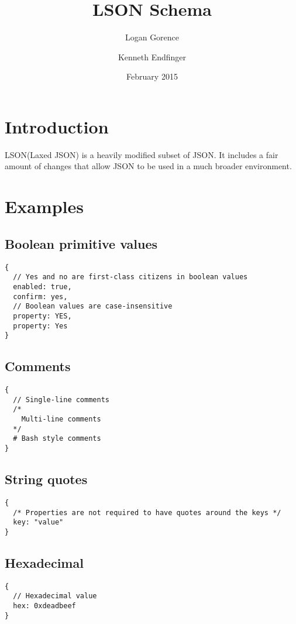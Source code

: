 \documentclass[12pt]{article}
\begin{document}
\title{LSON Schema}
\author{Logan Gorence \and Kenneth Endfinger}
\date{February 2015}
\maketitle
{}
\newpage

\tableofcontents
\newpage

\section{Introduction}
LSON(Laxed JSON) is a heavily modified subset of JSON. It includes a fair amount of changes that allow JSON to be used in a much  broader environment.

\section{Examples}
\subsection{Boolean primitive values}
\label{booleanPrimValueExample}
\begin{lstlisting}
{
  // Yes and no are first-class citizens in boolean values
  enabled: true,
  confirm: yes,
  // Boolean values are case-insensitive
  property: YES,
  property: Yes
}
\end{lstlisting}

\subsection{Comments}
\label{commentsExample}
\begin{lstlisting}
{
  // Single-line comments
  /*
    Multi-line comments
  */
  # Bash style comments
}
\end{lstlisting}

\subsection{String quotes}
\label{stringQuotesExample}
\begin{lstlisting}
{
  /* Properties are not required to have quotes around the keys */
  key: "value"
}
\end{lstlisting}

\subsection{Hexadecimal}
\label{hexExample}
\begin{lstlisting}
{
  // Hexadecimal value
  hex: 0xdeadbeef
}
\end{lstlisting}
\end{document}
